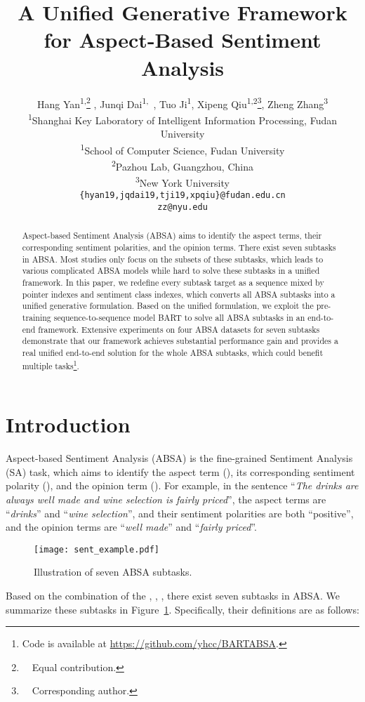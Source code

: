 \documentclass[11pt,a4paper]{article}
\title{A Unified Generative Framework for Aspect-Based Sentiment Analysis
}
\author{Hang Yan\textsuperscript{1,}\thanks{\ \  Equal contribution.} , Junqi Dai\textsuperscript{1,}\samethanks \ , Tuo Ji\textsuperscript{1}, Xipeng Qiu\textsuperscript{1,2}\thanks{\ \  Corresponding author.}, Zheng Zhang\textsuperscript{3}\\
  \textsuperscript{1}Shanghai Key Laboratory of Intelligent Information Processing, Fudan University \\
  \textsuperscript{1}School of Computer Science, Fudan University \\
  \textsuperscript{2}Pazhou Lab, Guangzhou, China \\
  \textsuperscript{3}New York University \\
  \texttt{\{hyan19,jqdai19,tji19,xpqiu\}@fudan.edu.cn}\\
  \texttt{zz@nyu.edu}\\}
\date{}
\begin{document}
\maketitle
\begin{abstract}
  Aspect-based Sentiment Analysis (ABSA) aims to identify the aspect terms, their corresponding sentiment polarities, and the opinion terms. There exist seven subtasks in ABSA. Most studies only focus on the subsets of these subtasks, which leads to various complicated ABSA models while hard to solve these subtasks in a unified framework. In this paper,  we redefine every subtask target as a sequence mixed by pointer indexes and sentiment class indexes, which converts all ABSA subtasks into a unified generative formulation. Based on the unified formulation, we exploit the pre-training sequence-to-sequence model BART to solve all ABSA subtasks in an end-to-end framework. Extensive experiments on four ABSA datasets for seven subtasks demonstrate that our framework achieves substantial performance gain and provides a real unified end-to-end solution for the whole ABSA subtasks, which could benefit multiple tasks\footnote{Code is available at \url{https://github.com/yhcc/BARTABSA}.}. \end{abstract}






\section{Introduction}
Aspect-based Sentiment Analysis (ABSA) is the fine-grained Sentiment Analysis (SA) task, which aims to identify the aspect term (), its corresponding sentiment polarity (),   and the opinion term ().
For example, in the sentence ``\textit{The \textcolor[rgb]{1.00,0.00,0.00}{drinks} are always \textcolor[RGB]{101,139,243}{well made} and \textcolor[rgb]{1.00,0.00,0.00}{wine selection} is \textcolor[RGB]{101,139,243}{fairly priced}}'', the aspect terms are ``\textit{\textcolor[rgb]{1.00,0.00,0.00}{drinks}}'' and ``\textit{\textcolor[rgb]{1.00,0.00,0.00}{wine selection}}'', and their sentiment polarities  are both ``\textcolor[RGB]{0, 176, 80}{positive}'', and the opinion terms are  ``\textit{\textcolor[RGB]{101,139,243}{well made}}'' and ``\textit{\textcolor[RGB]{101,139,243}{fairly priced}}''.
\begin{figure}[t]
  \texttt{[image: sent\_example.pdf]}
  \caption{Illustration of seven ABSA subtasks.
}\label{fig:sent_example}
\end{figure}
Based on the combination of the , , , there exist seven subtasks in ABSA. We summarize these subtasks in Figure~\ref{fig:sent_example}. Specifically, their definitions are  as follows:
\end{document}
